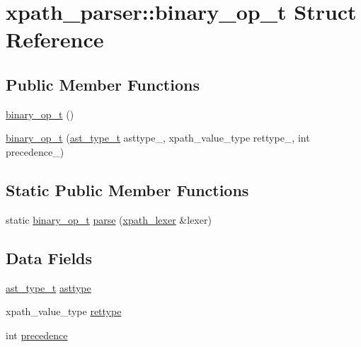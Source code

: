 \hypertarget{structxpath__parser_1_1binary__op__t}{\section{xpath\-\_\-parser\-:\-:binary\-\_\-op\-\_\-t Struct Reference}
\label{structxpath__parser_1_1binary__op__t}
}
\subsection*{Public Member Functions}
\begin{DoxyCompactItemize}
\item 
\hyperlink{structxpath__parser_1_1binary__op__t_a18cac63911120c27f5ee842b1e6afe35}{binary\-\_\-op\-\_\-t} ()
\item 
\hyperlink{structxpath__parser_1_1binary__op__t_a6b8a545436af8aa0c74c91e181a2b865}{binary\-\_\-op\-\_\-t} (\hyperlink{pugixml_8cpp_a11258a240266b84b6b0526930e5d330d}{ast\-\_\-type\-\_\-t} asttype\-\_\-, xpath\-\_\-value\-\_\-type rettype\-\_\-, int precedence\-\_\-)
\end{DoxyCompactItemize}
\subsection*{Static Public Member Functions}
\begin{DoxyCompactItemize}
\item 
static \hyperlink{structxpath__parser_1_1binary__op__t}{binary\-\_\-op\-\_\-t} \hyperlink{structxpath__parser_1_1binary__op__t_a723f5f2b66df47b4ac74455cb39b9544}{parse} (\hyperlink{classxpath__lexer}{xpath\-\_\-lexer} \&lexer)
\end{DoxyCompactItemize}
\subsection*{Data Fields}
\begin{DoxyCompactItemize}
\item 
\hyperlink{pugixml_8cpp_a11258a240266b84b6b0526930e5d330d}{ast\-\_\-type\-\_\-t} \hyperlink{structxpath__parser_1_1binary__op__t_a1af7e302de46bf45ffdb466cfd89fa15}{asttype}
\item 
xpath\-\_\-value\-\_\-type \hyperlink{structxpath__parser_1_1binary__op__t_a02c18d8d6d9a7ef28b2fefcb900e75bc}{rettype}
\item 
int \hyperlink{structxpath__parser_1_1binary__op__t_a422064e11cc65c6110c422568441b69c}{precedence}
\end{DoxyCompactItemize}


